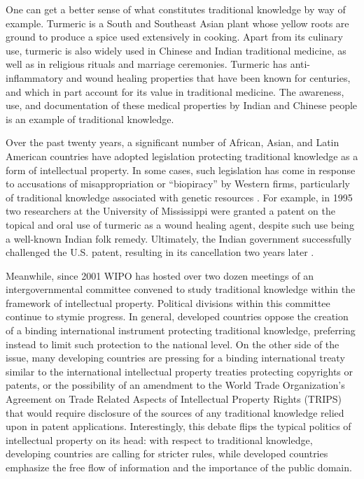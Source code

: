 \documentclass[12pt]{article}
\begin{document}
One can get a better sense of what constitutes traditional knowledge by way of example. Turmeric is 
a South and Southeast Asian plant whose yellow roots are ground to produce a spice used extensively 
in cooking. Apart from its culinary use, turmeric is also widely used in Chinese and Indian 
traditional medicine, as well as in religious rituals and marriage ceremonies. Turmeric has 
anti-inflammatory and wound healing properties that have been known for centuries, and which in part 
account for its value in traditional medicine. The awareness, use, and documentation of these medical 
properties by Indian and Chinese people is an example of traditional knowledge.

Over the past twenty years, a significant number of African, Asian, and Latin American countries have 
adopted legislation protecting traditional knowledge as a form of intellectual property. In some cases, 
such legislation has come in response to accusations of misappropriation or ``biopiracy'' by Western 
firms, particularly of traditional knowledge associated with genetic 
resources \citep{dagne2012protection}. For example, in 1995 two researchers at the University of Mississippi 
were granted a patent on the topical and oral use of turmeric as a wound healing agent, despite such 
use being a well-known Indian folk remedy. Ultimately, the Indian government successfully challenged the 
U.S. patent, resulting in its cancellation two years later \citep{kumar1997india}.

Meanwhile, since 2001 WIPO has hosted over two dozen meetings of an intergovernmental committee 
convened to study traditional knowledge within the framework of intellectual property. Political 
divisions within this committee continue to stymie progress. In general, developed countries 
oppose the creation of a binding international instrument protecting traditional knowledge, preferring 
instead to limit such protection to the national level. On the other side of the issue, many 
developing countries are pressing for a binding international treaty similar to the international 
intellectual property treaties protecting copyrights or patents, or the possibility of an amendment 
to the World Trade Organization's Agreement on Trade Related Aspects of Intellectual Property Rights 
(TRIPS) that would require disclosure of the sources of any traditional knowledge relied upon 
in patent applications. Interestingly, this debate flips the typical politics 
of intellectual property on its head: with respect to traditional knowledge, developing countries are 
calling for stricter rules, while developed countries emphasize the free flow of information and the 
importance of the public domain.
\end{document}
